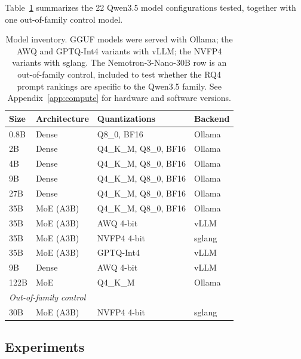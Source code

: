 \documentclass[11pt]{article}
\begin{document}
Table~\ref{tab:models} summarizes the 22 Qwen3.5 model configurations
tested, together with one out-of-family control model.

\begin{table}[h]
\centering
\caption{Model inventory. GGUF models were served with Ollama; the AWQ and
  GPTQ-Int4 variants with vLLM; the NVFP4 variants with sglang. The
  Nemotron-3-Nano-30B row is an out-of-family control, included to test
  whether the RQ4 prompt rankings are specific to the Qwen3.5 family.
  See Appendix~\ref{app:compute} for hardware and software versions.}
\label{tab:models}
\small
\begin{tabular}{llll}
\toprule
Size & Architecture & Quantizations & Backend \\
\midrule
0.8B & Dense & Q8\_0, BF16 & Ollama \\
2B & Dense & Q4\_K\_M, Q8\_0, BF16 & Ollama \\
4B & Dense & Q4\_K\_M, Q8\_0, BF16 & Ollama \\
9B & Dense & Q4\_K\_M, Q8\_0, BF16 & Ollama \\
27B & Dense & Q4\_K\_M, Q8\_0, BF16 & Ollama \\
35B & MoE (A3B) & Q4\_K\_M, Q8\_0, BF16 & Ollama \\
35B & MoE (A3B) & AWQ 4-bit & vLLM \\
35B & MoE (A3B) & NVFP4 4-bit & sglang \\
35B & MoE (A3B) & GPTQ-Int4 & vLLM \\
9B & Dense & AWQ 4-bit & vLLM \\
122B & MoE & Q4\_K\_M & Ollama \\
\midrule
\multicolumn{4}{l}{\emph{Out-of-family control}} \\
30B & MoE (A3B) & NVFP4 4-bit & sglang \\
\bottomrule
\end{tabular}
\end{table}

\subsection{Experiments}
\end{document}
